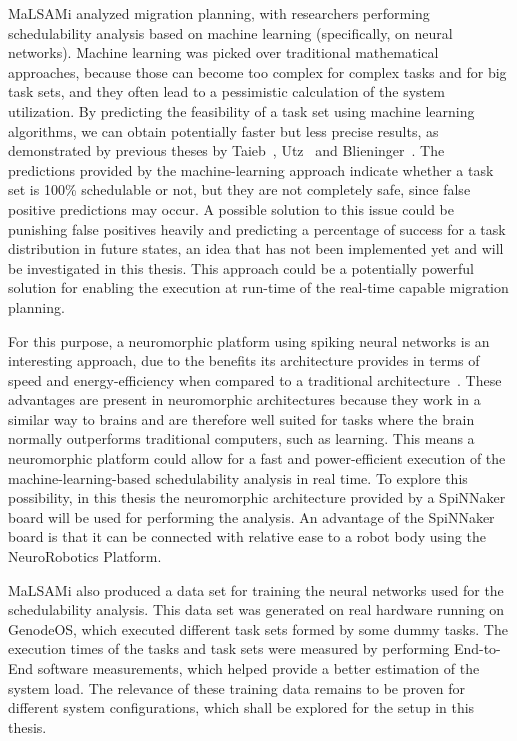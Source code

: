 MaLSAMi analyzed migration planning, with researchers performing schedulability analysis based on machine learning (specifically, on neural networks). Machine learning was picked over traditional mathematical approaches, because those can become too complex for complex tasks and  for big task sets, and they often lead to a pessimistic calculation of the system utilization. By predicting the feasibility of a task set using machine learning algorithms, we can obtain potentially faster but less precise results, as demonstrated by previous theses by Taieb~\parencite{taieb1}, Utz~\parencite{utz1} and Blieninger~\parencite{blieninger1}. The predictions provided by the machine-learning approach indicate whether a task set is 100\% schedulable or not, but they are not completely safe, since false positive predictions may occur. A possible solution to this issue could be punishing false positives heavily and predicting a percentage of success for a task distribution in future states, an idea that has not been implemented yet and will be investigated in this thesis. This approach could be a potentially powerful solution for enabling the execution at run-time of the real-time capable migration planning.

For this purpose, a neuromorphic platform using spiking neural networks is an interesting approach, due to the benefits its architecture provides in terms of speed and energy-efficiency when compared to a traditional architecture~\parencite{bersuker1}. These advantages are present in neuromorphic architectures because they work in a similar way to brains and are therefore well suited for tasks where the brain normally outperforms traditional computers, such as learning. This means a neuromorphic platform could allow for a fast and power-efficient execution of the machine-learning-based schedulability analysis in real time. To explore this possibility, in this thesis the neuromorphic architecture provided by a SpiNNaker board will be used for performing the analysis. An advantage of the SpiNNaker board is that it can be connected with relative ease to a robot body using the NeuroRobotics Platform.

MaLSAMi also produced a data set for training the neural networks used for the schedulability analysis. This data set was generated on real hardware running on GenodeOS, which executed different task sets formed by some dummy tasks. The execution times of the tasks and task sets were measured by performing End-to-End software measurements, which helped provide a better estimation of the system load. The relevance of these training data remains to be proven for different system configurations, which shall be explored for the setup in this thesis.

